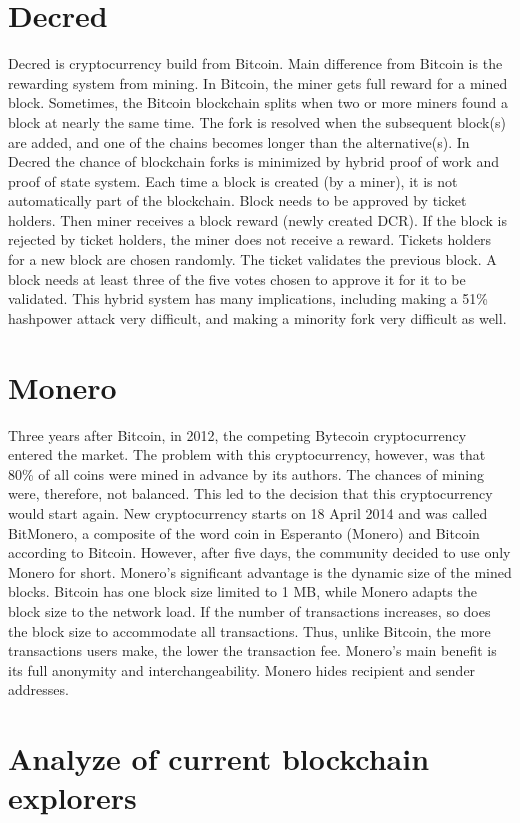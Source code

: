 \section{Decred}
Decred is cryptocurrency build from Bitcoin. Main difference from Bitcoin is the rewarding system from mining. In Bitcoin, the miner gets full reward for a mined block. Sometimes, the Bitcoin blockchain splits when two or more miners found a block at nearly the same time. The fork is resolved when the subsequent block(s) are added, and one of the chains becomes longer than the alternative(s). In Decred the chance of blockchain forks is minimized by hybrid proof of work and proof of state system. Each time a block is created (by a miner), it is not automatically part of the blockchain. Block needs to be approved by ticket holders. Then miner receives a block reward (newly created DCR). If the block is rejected by ticket holders, the miner does not receive a reward. Tickets holders for a new block are chosen randomly. The ticket validates the previous block. A block needs at least three of the five votes chosen to approve it for it to be validated.  This hybrid system has many implications, including making a 51\% hashpower attack very difficult, and making a minority fork very difficult as well.\cite{decredWhitePaper}

\section{Monero}
Three years after Bitcoin, in 2012, the competing Bytecoin cryptocurrency entered the market. The problem with this cryptocurrency, however, was that 80\% of all coins were mined in advance by its authors. The chances of mining were, therefore, not balanced. This led to the decision that this cryptocurrency would start again. New cryptocurrency starts on 18 April 2014 and was called BitMonero, a composite of the word coin in Esperanto (Monero) and Bitcoin according to Bitcoin. However, after five days, the community decided to use only Monero for short. Monero's significant advantage is the dynamic size of the mined blocks. Bitcoin has one block size limited to 1 MB, while Monero adapts the block size to the network load. If the number of transactions increases, so does the block size to accommodate all transactions. Thus, unlike Bitcoin, the more transactions users make, the lower the transaction fee. Monero's main benefit is its full anonymity and interchangeability. Monero hides recipient and sender addresses.\cite{moneroTracebility}

\section{Analyze of current blockchain explorers}
